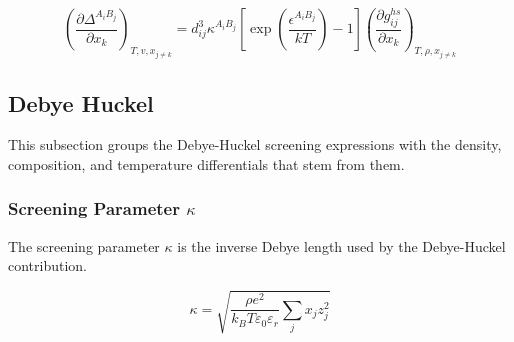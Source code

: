 \documentclass[12pt, letterpaper]{article}
\begin{document}
\begin{equation}
    \left(\frac{\partial \Delta^{A_{i}B_{j}}}{\partial x_{k}}\right)_{T,v,x_{j\neq k}}
    =
    d_{ij}^{3}\kappa^{A_{i}B_{j}}
    \left[\exp\!\left(\frac{\epsilon^{A_{i}B_{j}}}{kT}\right)-1\right]
    \left(\frac{\partial g_{ij}^{hs}}{\partial x_{k}}\right)_{T,\rho,x_{j\neq k}}
    \label{eq:ddelta_assoc_dxk}
\end{equation}

\subsection{Debye Huckel}
\label{sec:debye_huckel}

This subsection groups the Debye-Huckel screening expressions with the density, composition, and temperature differentials that stem from them.

\subsubsection{Screening Parameter \(\kappa\)}

The screening parameter \(\kappa\) is the inverse Debye length used by the Debye-Huckel contribution.

\begin{equation}
    \kappa=\sqrt{\frac{\rho e^{2}}{k_{B}T\varepsilon_{0}\varepsilon_{r}}\sum_{j}x_{j}z_{j}^{2}}
    \label{eq:kappa_dh}
\end{equation}

\end{document}
